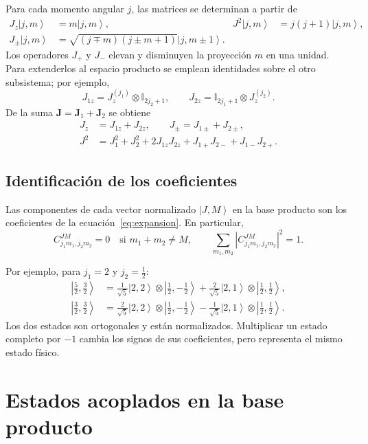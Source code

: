 \documentclass[11pt,a4paper]{article}
\newcommand{\ket}[1]{\left|#1\right\rangle}
\newcommand{\id}{\mathbb{I}}
\begin{document}
Para cada momento angular $j$, las matrices se determinan a partir de
\begin{align}
 J_z\ket{j,m}&=m\ket{j,m}, &
 J^2\ket{j,m}&=j(j+1)\ket{j,m},\\
 J_\pm\ket{j,m}&=\sqrt{(j\mp m)(j\pm m+1)}\ket{j,m\pm1}.
\end{align}
Los operadores $J_+$ y $J_-$ elevan y disminuyen la proyección $m$ en
una unidad. Para extenderlos al espacio producto se emplean identidades
sobre el otro subsistema; por ejemplo,
\begin{equation}
 J_{1z}=J_z^{(j_1)}\otimes\id_{2j_2+1},\qquad
 J_{2z}=\id_{2j_1+1}\otimes J_z^{(j_2)}.
\end{equation}
De la suma $\mathbf{J}=\mathbf{J}_1+\mathbf{J}_2$ se obtiene
\begin{align}
 J_z&=J_{1z}+J_{2z},\qquad J_\pm=J_{1\pm}+J_{2\pm},\\
 J^2&=J_1^2+J_2^2+2J_{1z}J_{2z}
       +J_{1+}J_{2-}+J_{1-}J_{2+}.
\end{align}

\subsection{Identificación de los coeficientes}

Las componentes de cada vector normalizado $\ket{J,M}$ en la base
producto son los coeficientes de la ecuación~\eqref{eq:expansion}.
En particular,
\begin{equation}
 C^{JM}_{j_1m_1,j_2m_2}=0\quad\text{si }m_1+m_2\neq M,
 \qquad
 \sum_{m_1,m_2}\left|C^{JM}_{j_1m_1,j_2m_2}\right|^2=1.
\end{equation}

Por ejemplo, para $j_1=2$ y $j_2=\tfrac12$:
\begin{align}
 \ket{\tfrac52,\tfrac32}
 &=\frac{1}{\sqrt5}\ket{2,2}\otimes\ket{\tfrac12,-\tfrac12}
   +\frac{2}{\sqrt5}\ket{2,1}\otimes\ket{\tfrac12,\tfrac12},\\
 \ket{\tfrac32,\tfrac32}
 &=\frac{2}{\sqrt5}\ket{2,2}\otimes\ket{\tfrac12,-\tfrac12}
   -\frac{1}{\sqrt5}\ket{2,1}\otimes\ket{\tfrac12,\tfrac12}.
\end{align}
Los dos estados son ortogonales y están normalizados. Multiplicar un
estado completo por $-1$ cambia los signos de sus coeficientes, pero
representa el mismo estado físico.


\clearpage
\section{Estados acoplados en la base producto}
\end{document}
